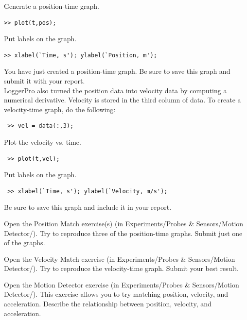 \documentclass[11pt,letterpaper]{article}
\newcounter{question}[section]
\begin{document}
Generate a position-time graph.
\begin{verbatim}>> plot(t,pos);\end{verbatim}

Put labels on the graph.
\begin{verbatim}>> xlabel(`Time, s'); ylabel(`Position, m');
\end{verbatim}

You have just created a position-time graph. Be sure to save this graph and submit it with your report.\\


LoggerPro also turned the position data into velocity data by computing a numerical derivative. Velocity is stored in the third column of data. To create a velocity-time graph, do the following:

\begin{verbatim} >> vel = data(:,3);\end{verbatim}

Plot the velocity vs. time.
\begin{verbatim} >> plot(t,vel);\end{verbatim}

Put labels on the graph.
\begin{verbatim} >> xlabel(`Time, s'); ylabel(`Velocity, m/s');
\end{verbatim}
Be sure to save this graph and include it in your report.

\question{} Open the Position Match exercise(s) (in Experiments/Probes \& Sensors/Motion Detector/). Try to reproduce three of the position-time graphs. Submit just one of the graphs.

\question{} Open the Velocity Match exercise (in Experiments/Probes \&
Sensors/Motion Detector/).  Try to reproduce the velocity-time graph. Submit your best result.

\question{} Open the Motion Detector exercise (in Experiments/Probes \& Sensors/Motion Detector/). This exercise allows you to try matching position, velocity, and acceleration. Describe the relationship between position, velocity, and acceleration.\vspace{6cm}

\end{document}
